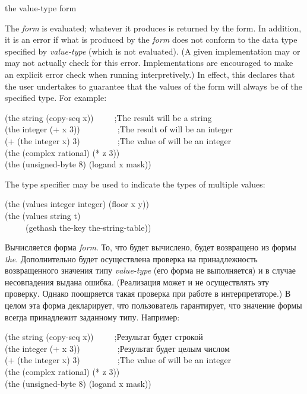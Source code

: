 \begin{defspec}
the value-type form

The \emph{form} is evaluated; whatever it produces is returned by
the  form.  In addition, it is an error if what is produced
by the \emph{form} does not conform to the data type specified by \emph{value-type}
(which is not evaluated).  (A given implementation may or may not
actually check for this error.  Implementations are encouraged to make an
explicit error check when running interpretively.)  In effect, this
declares that the user undertakes to guarantee that the values of
the form will always be of the specified type.
For example:
\begin{lisp}
(the string (copy-seq x))~~~~~;\textrm{The result will be a string} \\
(the integer (+ x 3))~~~~~~~~~;\textrm{The result of \cdf{+} will be an integer} \\
(+ (the integer x) 3)~~~~~~~~~;\textrm{The value of  will be an integer} \\
(the (complex rational) (* z 3)) \\
(the (unsigned-byte 8) (logand x mask))
\end{lisp}
The  type specifier may be used to indicate the types
of multiple values:
\begin{lisp}
(the (values integer integer) (floor x y)) \\
(the (values string t) \\
~~~~~(gethash the-key the-string-table))
\end{lisp}

Вычисляется форма \emph{form}. То, что будет вычислено, будет возвращено из
формы \emph{the}. Дополнительно будет осуществлена проверка на принадлежность
возвращенного значения типу \emph{value-type} (его форма не выполняется) и в
случае несовпадения выдана ошибка. (Реализация может и не осуществлять эту
проверку. Однако поощряется такая проверка при работе в интерпретаторе.) В целом
эта форма декларирует, что пользователь гарантирует, что значение формы всегда
принадлежит заданному типу.
Например:
\begin{lisp}
(the string (copy-seq x))~~~~~;\textrm{Результат будет строкой} \\
(the integer (+ x 3))~~~~~~~~~;\textrm{Результат \cdf{+} будет целым числом} \\
(+ (the integer x) 3)~~~~~~~~~;\textrm{The value of  will be an integer} \\
(the (complex rational) (* z 3)) \\
(the (unsigned-byte 8) (logand x mask))
\end{lisp}



\end{defspec}

